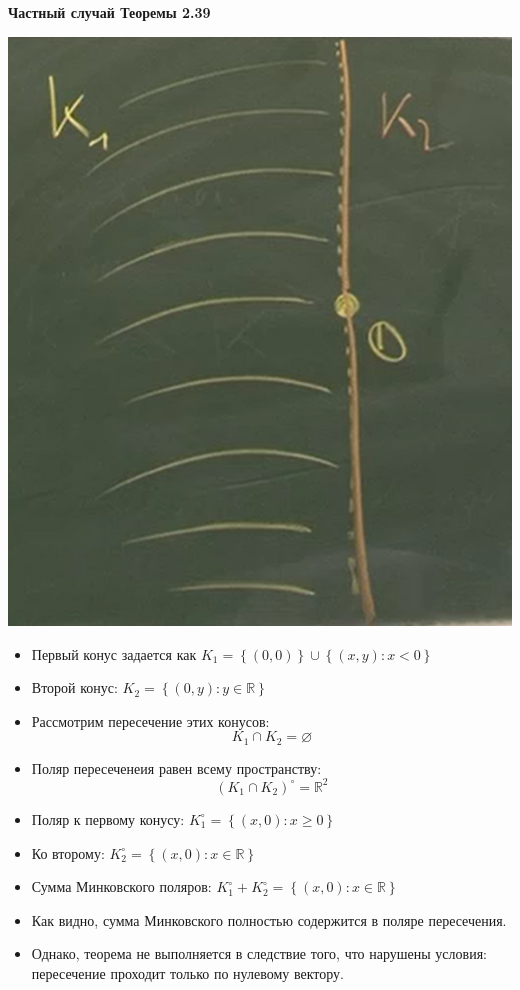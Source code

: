 \textbf{Частный случай Теоремы 2.39}
\begin{center}
\includegraphics[scale=0.5]{image31.png}
\end{center}
\begin{itemize}
\item Первый конус задается как $K_{1}=\left\lbrace(0,0)\right\rbrace \cup \left\lbrace(x,y): x < 0\right\rbrace$
\item Второй конус: $K_{2}=\left\lbrace \left(0,y \right): y\in\mathbb{R}\right\rbrace$
\item Рассмотрим пересечение этих конусов:
\begin{equation*}
 K_{1}\cap K_{2} = \varnothing
\end{equation*}
\item Поляр пересеченеия равен всему пространству:
\begin{equation*}
\left( K_{1}\cap K_{2} \right)^{\circ} = \mathbb{R}^{2}
\end{equation*}
\item Поляр к первому конусу: $K_{1}^{\circ}=\left\lbrace(x,0): x\geq 0\right\rbrace$
\item Ко второму: $K_{2}^{\circ}=\left\lbrace(x,0): x\in\mathbb{R}\right\rbrace$
\item Сумма Минковского поляров: $K_{1}^{\circ} + K_{2}^{\circ}=\left\lbrace(x,0): x\in\mathbb{R}\right\rbrace$
\item Как видно, сумма Минковского полностью содержится в поляре пересечения.
\item Однако, теорема не выполняется в следствие того, что нарушены условия: пересечение проходит только по нулевому вектору.
\end{itemize}

